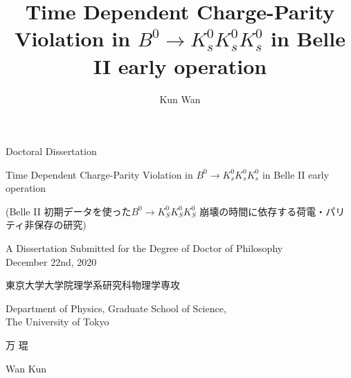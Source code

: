 \begin{center}
\large
Doctoral Dissertation
\vspace{0.6cm}

Time Dependent Charge-Parity Violation in $B^0 \to K^0_s K^0_s K^0_s $ in Belle II early operation\\
\end{center}
\begin{CJK}{UTF8}{min}
	\large
	\centering
	(Belle II 初期データを使った$B^0 \to K_S^0  K_S^0  K_S^0$ 崩壊の時間に依存する荷電・パリティ非保存の研究)\\
	\vspace{1cm}
\end{CJK}
\begin{CJK}{UTF8}{min}
	\large
\end{CJK}
\begin{center}
	\large
A Dissertation Submitted for the Degree of Doctor of Philosophy
\\
December 22nd,
2020
\vspace{1cm}
\end{center}
\begin{CJK}{UTF8}{min}
	\large
	\centering
東京大学大学院理学系研究科物理学専攻\\
\end{CJK}
\begin{center}
	\large
	Department of Physics, Graduate School of Science,
\\
	The University of Tokyo
	\vspace{0.6cm}
\end{center}

\begin{CJK}{UTF8}{min}
	\large
	\centering
	万 琨\\
\end{CJK}
\begin{center}
	\large
	Wan Kun 
\end{center}


\title{Time Dependent Charge-Parity Violation in $B^0 \to K^0_s K^0_s K^0_s $ in Belle II early operation}

\author{Kun Wan}

